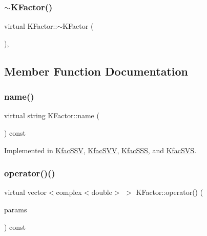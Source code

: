 \subsubsection{\texorpdfstring{$\sim$KFactor()}{~KFactor()}}
{\footnotesize\ttfamily virtual K\+Factor\+::$\sim$\+K\+Factor (\begin{DoxyParamCaption}{ }\end{DoxyParamCaption})\hspace{0.3cm}{\ttfamily [inline]}, {\ttfamily [virtual]}}



\subsection{Member Function Documentation}
\mbox{\label{classKFactor_ae578f8d6e4b525895427717da99cab6c}} 
\subsubsection{\texorpdfstring{name()}{name()}}
{\footnotesize\ttfamily virtual string K\+Factor\+::name (\begin{DoxyParamCaption}{ }\end{DoxyParamCaption}) const\hspace{0.3cm}{\ttfamily [pure virtual]}}



Implemented in \mbox{\hyperlink{classKfacSSV_a72d5e577525fa97365dbcfd4c5bea88d}{Kfac\+S\+SV}}, \mbox{\hyperlink{classKfacSVV_ad7ab40ec924a678cd785a9743e676d6c}{Kfac\+S\+VV}}, \mbox{\hyperlink{classKfacSSS_a2c22369b8bb0ac1be72f981c8c119719}{Kfac\+S\+SS}}, and \mbox{\hyperlink{classKfacSVS_af7a1fd20af79d6a2f844cf4418a5eeb8}{Kfac\+S\+VS}}.

\mbox{\label{classKFactor_a012aae9ff4a07eab86d5d50b7f774285}} 
\subsubsection{\texorpdfstring{operator()()}{operator()()}}
{\footnotesize\ttfamily virtual vector$<$complex$<$double$>$ $>$ K\+Factor\+::operator() (\begin{DoxyParamCaption}\item[{const \mbox{\hyperlink{classKFacParams}{K\+Fac\+Params}} \&}]{params }\end{DoxyParamCaption}) const\hspace{0.3cm}{\ttfamily [pure virtual]}}



